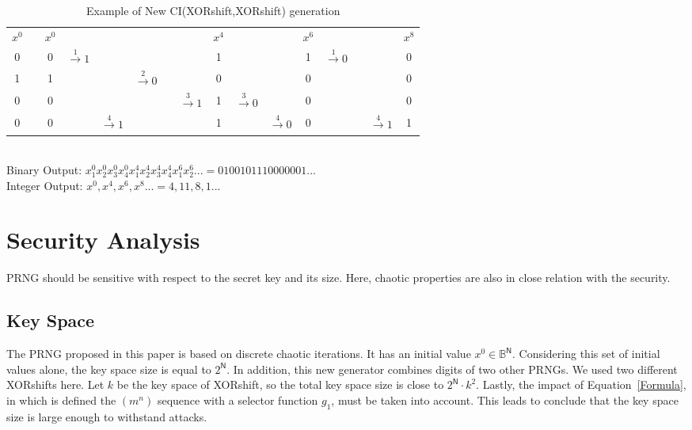 \documentclass[journal]{IEEEtran}
\begin{document}
\begin{table*}[!t]
\begin{tabular}{|c|cc|cccccc|ccc|cccc|}
$x^{0}$ &  &$x^{0}$ & & &  
&  & &$x^{4}$ & & &   
$x^{6}$& & &&$x^{8}$  \\
0 & &0 &$\xrightarrow{1} 1$ & &
 & &   &1   & & &
1 &$\xrightarrow{1} 0$ & & & 0\\
1 &  &1 &   &   &
$\xrightarrow{2} 0$ & & &0 & & &
0 & &  &&0\\
0 & &0 & & &
 & &$\xrightarrow{3} 1$ &1 &$\xrightarrow{3} 0$ & &
0 &   & & &0  \\
0 & &0  & &$\xrightarrow{4} 1$ &
 & & &1 & &$\xrightarrow{4} 0$ &
0 & & &$\xrightarrow{4} 1$&1 \\
\hline
\end{tabular}\\
\vspace{0.5cm}
Binary Output: $x_1^{0}x_2^{0}x_3^{0}x_4^{0}x_1^{4}x_2^{4}x_3^{4}x_4^{4}x_1^{6}x_2^{6}... = 0100101110000001...$\\
Integer Output:
$x^{0},x^{4},x^{6},x^{8}... = 4,11,8,1...$
\caption{Example of New CI(XORshift,XORshift) generation}
\label{table application example}
\end{table*}




\section{Security Analysis}
\label{Security analysis}
PRNG should be sensitive with respect to the secret key and its size. Here, chaotic properties are also in close relation with the security.



\subsection{Key Space}

The PRNG proposed in this paper is based on discrete chaotic iterations. It has an initial
value $x^0\in \mathds{B}^{\mathsf{N}}$. Considering this set of initial values alone, the key space size
is equal to $2^\mathsf{N}$. In addition, this new generator combines digits of two other PRNGs. We used two different XORshifts here. Let $k$ be the key space of XORshift, so the total key space
size is close to $2^\mathsf{N}\cdot k^2$. Lastly, the impact of Equation~\ref{Formula}, in which is defined the $(m^n)$ sequence with a selector function $g_1$, must be
taken into account. This leads to conclude that the key space size is large enough to withstand
attacks.
\end{document}
